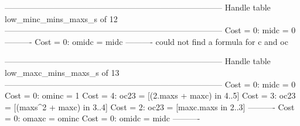 --------------------------------------------------------------------------------
Handle table low_minc_mins_maxs_s of 12
--------------------------------------------------------------------------------
Cost =  0:  midc  = 0
----------
Cost =  0:  omidc = midc
----------
could not find a formula for c and oc


--------------------------------------------------------------------------------
Handle table low_maxc_mins_maxs_s of 13
--------------------------------------------------------------------------------
Cost =  0:  midc  = 0
Cost =  0:  ominc = 1
Cost =  4:  oc23  = [(2.maxs + maxc) in 4..5]
Cost =  3:  oc23  = [(maxs^2 + maxc) in 3..4]
Cost =  2:  oc23  = [maxc.maxs in 2..3]
----------
Cost =  0:  omaxc = ominc
Cost =  0:  omidc = midc
----------
